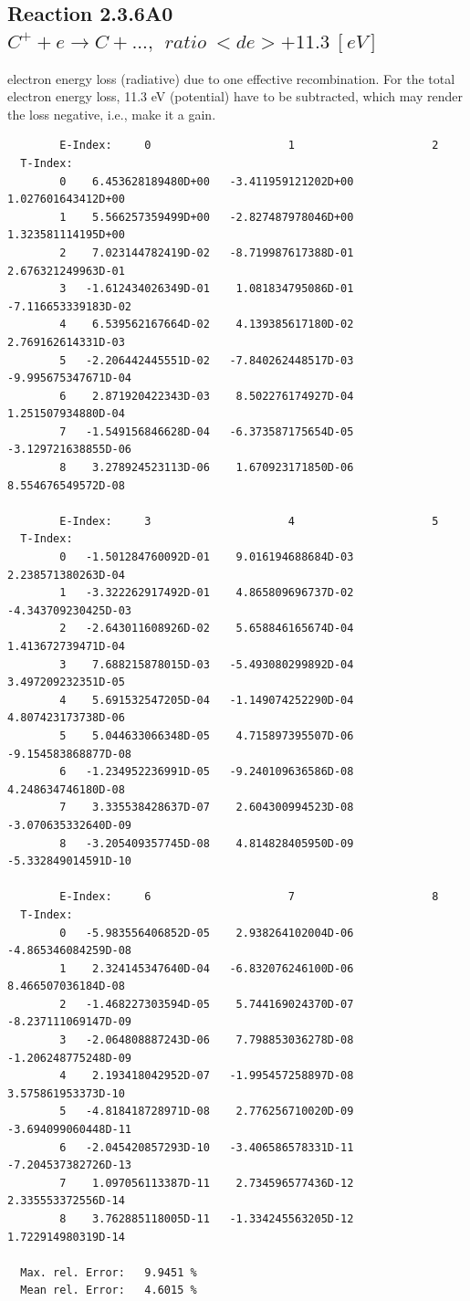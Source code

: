 \documentclass[12pt,dvips]{article}
\begin{document}
\subsection{
  Reaction 2.3.6A0 $C^+ + e \rightarrow C     + ..., \ \   ratio ~  <de>+11.3 \ [eV] $
}

  electron energy loss (radiative) due to one effective recombination.
  For the total electron energy loss, 11.3 eV (potential) have to be
  subtracted, which may render the loss negative, i.e., make it a gain.

\begin{small}\begin{verbatim}
        E-Index:     0                     1                     2
  T-Index:
        0    6.453628189480D+00   -3.411959121202D+00    1.027601643412D+00
        1    5.566257359499D+00   -2.827487978046D+00    1.323581114195D+00
        2    7.023144782419D-02   -8.719987617388D-01    2.676321249963D-01
        3   -1.612434026349D-01    1.081834795086D-01   -7.116653339183D-02
        4    6.539562167664D-02    4.139385617180D-02    2.769162614331D-03
        5   -2.206442445551D-02   -7.840262448517D-03   -9.995675347671D-04
        6    2.871920422343D-03    8.502276174927D-04    1.251507934880D-04
        7   -1.549156846628D-04   -6.373587175654D-05   -3.129721638855D-06
        8    3.278924523113D-06    1.670923171850D-06    8.554676549572D-08

        E-Index:     3                     4                     5
  T-Index:
        0   -1.501284760092D-01    9.016194688684D-03    2.238571380263D-04
        1   -3.322262917492D-01    4.865809696737D-02   -4.343709230425D-03
        2   -2.643011608926D-02    5.658846165674D-04    1.413672739471D-04
        3    7.688215878015D-03   -5.493080299892D-04    3.497209232351D-05
        4    5.691532547205D-04   -1.149074252290D-04    4.807423173738D-06
        5    5.044633066348D-05    4.715897395507D-06   -9.154583868877D-08
        6   -1.234952236991D-05   -9.240109636586D-08    4.248634746180D-08
        7    3.335538428637D-07    2.604300994523D-08   -3.070635332640D-09
        8   -3.205409357745D-08    4.814828405950D-09   -5.332849014591D-10

        E-Index:     6                     7                     8
  T-Index:
        0   -5.983556406852D-05    2.938264102004D-06   -4.865346084259D-08
        1    2.324145347640D-04   -6.832076246100D-06    8.466507036184D-08
        2   -1.468227303594D-05    5.744169024370D-07   -8.237111069147D-09
        3   -2.064808887243D-06    7.798853036278D-08   -1.206248775248D-09
        4    2.193418042952D-07   -1.995457258897D-08    3.575861953373D-10
        5   -4.818418728971D-08    2.776256710020D-09   -3.694099060448D-11
        6   -2.045420857293D-10   -3.406586578331D-11   -7.204537382726D-13
        7    1.097056113387D-11    2.734596577436D-12    2.335553372556D-14
        8    3.762885118005D-11   -1.334245563205D-12    1.722914980319D-14

  Max. rel. Error:   9.9451 %
  Mean rel. Error:   4.6015 %



\end{verbatim}\end{small}
\end{document}
